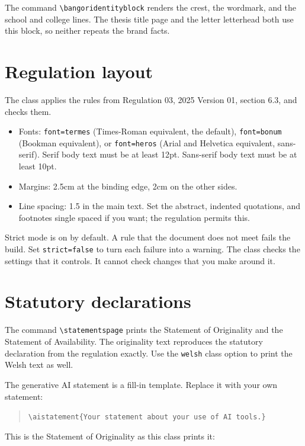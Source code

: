 \documentclass[dissertation,tables,glossary,12pt,a4paper]{bangor}
\begin{document}
The command \verb|\bangoridentityblock| renders the crest, the wordmark, and the school and college lines. The thesis title page and the letter letterhead both use this block, so neither repeats the brand facts.

\chapter{Regulation layout}
The class applies the rules from Regulation 03, 2025 Version 01, section 6.3, and checks them.

\begin{itemize}
  \item Fonts: \verb|font=termes| (Times-Roman equivalent, the default), \verb|font=bonum| (Bookman equivalent), or \verb|font=heros| (Arial and Helvetica equivalent, sans-serif). Serif body text must be at least 12pt. Sans-serif body text must be at least 10pt.
  \item Margins: 2.5cm at the binding edge, 2cm on the other sides.
  \item Line spacing: 1.5 in the main text. Set the abstract, indented quotations, and footnotes single spaced if you want; the regulation permits this.
\end{itemize}

Strict mode is on by default. A rule that the document does not meet fails the build. Set \verb|strict=false| to turn each failure into a warning. The class checks the settings that it controls. It cannot check changes that you make around it.

\chapter{Statutory declarations}
The command \verb|\statementspage| prints the Statement of Originality and the Statement of Availability. The originality text reproduces the statutory declaration from the regulation exactly. Use the \verb|welsh| class option to print the Welsh text as well.

The generative AI statement is a fill-in template. Replace it with your own statement:

\begin{quote}
  \verb|\aistatement{Your statement about your use of AI tools.}|
\end{quote}

This is the Statement of Originality as this class prints it:

\originalitystatement
\end{document}
